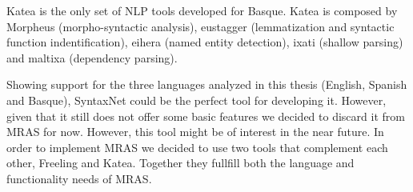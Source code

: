 \documentclass{bsu-ms}
\newcommand{\projectName}{MRAS\xspace}
\begin{document}
Katea is the only set of NLP tools developed for Basque. Katea is composed by Morpheus \cite{morpheus} (morpho-syntactic analysis), eustagger \cite{eustagger} (lemmatization and syntactic function indentification), eihera \cite{eihera} (named entity detection), ixati \cite{morpheus} (shallow parsing) and maltixa \cite{maltixa} (dependency parsing).


Showing support for the three languages analyzed in this thesis (English, Spanish and Basque), SyntaxNet could be the perfect tool for developing it. However, given that it still does not offer some basic features we decided to discard it from \projectName for now. However, this tool might be of interest in the near future. In order to implement \projectName we decided to use two tools that complement each other, Freeling and Katea. Together they fullfill both the language and functionality needs of \projectName .


\begin{table}[h]
\centering
{}
\caption{Comparison of existing NLP tools}
\label{tab:toolComparison}
\end{table}
\end{document}
